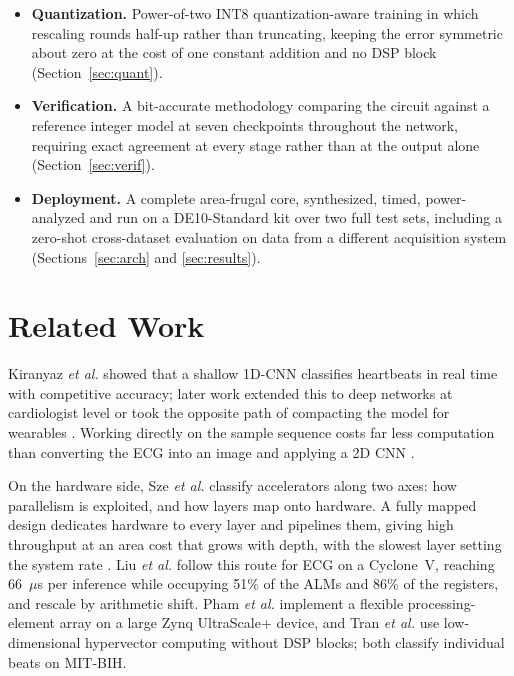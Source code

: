 \documentclass[conference,10pt]{IEEEtran}
\begin{document}
\begin{itemize}
\item \textbf{Quantization.} Power-of-two INT8 quantization-aware training in
which rescaling rounds half-up rather than truncating, keeping the error
symmetric about zero at the cost of one constant addition and no DSP block
(Section~\ref{sec:quant}).
\item \textbf{Verification.} A bit-accurate methodology comparing the circuit
against a reference integer model at seven checkpoints throughout the network,
requiring exact agreement at every stage rather than at the output alone
(Section~\ref{sec:verif}).
\item \textbf{Deployment.} A complete area-frugal core, synthesized, timed,
power-analyzed and run on a DE10-Standard kit over two full test sets, including
a zero-shot cross-dataset evaluation on data from a different acquisition system
(Sections~\ref{sec:arch} and \ref{sec:results}).
\end{itemize}

\section{Related Work}

Kiranyaz \emph{et al.} \cite{kiranyaz2016} showed that a shallow 1D-CNN
classifies heartbeats in real time with competitive accuracy; later work extended
this to deep networks at cardiologist level \cite{hannun2019} or took the
opposite path of compacting the model for wearables \cite{le2023}. Working
directly on the sample sequence costs far less computation than converting the
ECG into an image and applying a 2D CNN \cite{yoon2023}.

On the hardware side, Sze \emph{et al.} \cite{sze2017} classify accelerators
along two axes: how parallelism is exploited, and how layers map onto hardware. A
fully mapped design dedicates hardware to every layer and pipelines them, giving
high throughput at an area cost that grows with depth, with the slowest layer
setting the system rate \cite{venieris2018}. Liu \emph{et al.} \cite{liu2023}
follow this route for ECG on a Cyclone~V, reaching 66~$\mu$s per inference while
occupying 51\% of the ALMs and 86\% of the registers, and rescale by arithmetic
shift. Pham \emph{et al.} \cite{pham2025} implement a flexible processing-element
array on a large Zynq UltraScale+ device, and Tran \emph{et al.} \cite{tran2026}
use low-dimensional hypervector computing without DSP blocks; both classify
individual beats on MIT-BIH.
\end{document}
